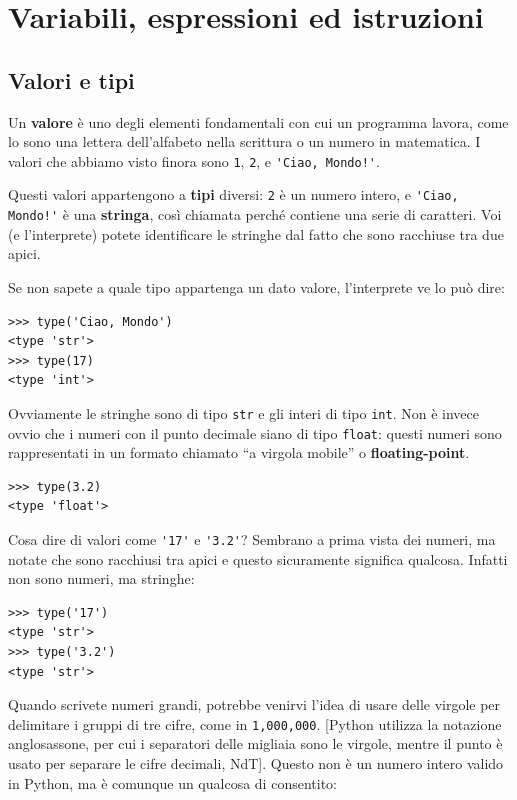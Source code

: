 \documentclass[10pt]{book}
\begin{document}
\chapter{Variabili, espressioni ed istruzioni}

\section{Valori e tipi}

Un {\bf valore} è uno degli elementi fondamentali con cui un programma lavora, come lo sono una lettera dell'alfabeto nella scrittura o un numero in matematica. I valori che abbiamo visto finora sono
{\tt 1}, {\tt 2}, e
\verb"'Ciao, Mondo!'".

Questi valori appartengono a {\bf tipi} diversi:
{\tt 2} è un numero intero, e \verb"'Ciao, Mondo!'" è una {\bf stringa},
così chiamata perché contiene una serie di caratteri. Voi (e l'interprete) potete identificare le stringhe dal fatto che sono racchiuse tra due apici.

Se non sapete a quale tipo appartenga un dato valore, l'interprete ve lo può dire:

\begin{verbatim}
>>> type('Ciao, Mondo')
<type 'str'>
>>> type(17)
<type 'int'>
\end{verbatim}
%
Ovviamente le stringhe sono di tipo {\tt str} e gli interi di
   tipo {\tt int}. Non è invece ovvio che i numeri con il punto
   decimale siano di tipo {\tt float}: questi numeri sono rappresentati
   in un formato chiamato ``a virgola mobile'' o {\bf floating-point}.

\begin{verbatim}
>>> type(3.2)
<type 'float'>
\end{verbatim}
%
Cosa dire di valori come \verb"'17'" e \verb"'3.2'"?
Sembrano a prima vista dei numeri, ma notate che sono racchiusi tra apici e questo sicuramente significa qualcosa. Infatti non sono numeri, ma stringhe:

\begin{verbatim}
>>> type('17')
<type 'str'>
>>> type('3.2')
<type 'str'>
\end{verbatim}
%


Quando scrivete numeri grandi, potrebbe venirvi l'idea di usare delle virgole per delimitare i gruppi di tre cifre, come in {\tt 1,000,000}. [Python utilizza la notazione anglosassone, per cui i separatori delle migliaia sono le virgole, mentre il punto è usato per separare le cifre decimali, NdT]. Questo non è un numero intero valido in Python, ma è comunque un qualcosa di consentito:
\end{document}
